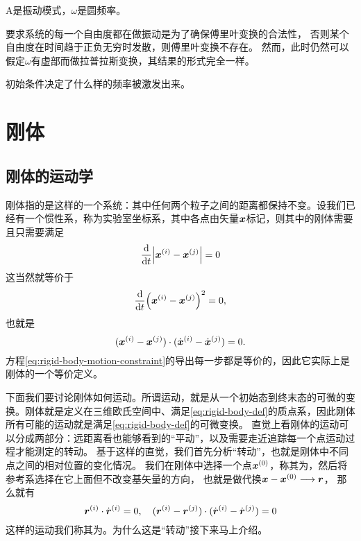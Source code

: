 A是振动模式，$\omega$是圆频率。

要求系统的每一个自由度都在做振动是为了确保傅里叶变换的合法性，
否则某个自由度在时间趋于正负无穷时发散，则傅里叶变换不存在。
然而，此时仍然可以假定$\omega$有虚部而做拉普拉斯变换，其结果的形式完全一样。

初始条件决定了什么样的频率被激发出来。

\chapter{刚体}

\section{刚体的运动学}

刚体指的是这样的一个系统：其中任何两个粒子之间的距离都保持不变。设我们已经有一个惯性系，称为实验室坐标系，其中各点由矢量$\vb*{x}$标记，则其中的刚体需要且只需要满足
\begin{equation}
    \dv{t} \abs{\vb*{x}^{(i)} - \vb*{x}^{(j)}} = 0
    \label{eq:rigid-body-def}
\end{equation}
这当然就等价于
\[
    \dv{t} (\vb*{x}^{(i)} - \vb*{x}^{(j)})^2 = 0,
\]
也就是
\begin{equation}
    (\vb*{x}^{(i)} - \vb*{x}^{(j)}) \cdot (\dot{\vb*{x}}^{(i)} - \dot{\vb*{x}}^{(j)}) = 0.
    \label{eq:rigid-body-motion-constraint}
\end{equation}
方程\eqref{eq:rigid-body-motion-constraint}的导出每一步都是等价的，因此它实际上是刚体的一个等价定义。

下面我们要讨论刚体如何运动。所谓运动，就是从一个初始态到终末态的可微的变换。刚体就是定义在三维欧氏空间中、满足\eqref{eq:rigid-body-def}的质点系，因此刚体所有可能的运动就是满足\eqref{eq:rigid-body-def}的可微变换。
直觉上看刚体的运动可以分成两部分：远距离看也能够看到的“平动”，以及需要走近追踪每一个点运动过程才能测定的转动。
基于这样的直觉，我们首先分析“转动”，也就是刚体中不同点之间的相对位置的变化情况。
我们在刚体中选择一个点$\vb*{x}^{(0)}$，称其为，然后将参考系选择在它上面但不改变基矢量的方向，
也就是做代换$\vb*{x} - \vb*{x}^{(0)} \longrightarrow \vb*{r}$，
那么就有
\begin{equation}
    \vb*{r}^{(i)} \cdot {\dot{\vb*{r}}}^{(i)} = 0, \quad (\vb*{r}^{(i)} - \vb*{r}^{(j)}) \cdot (\dot{\vb*{r}}^{(i)} - \dot{\vb*{r}}^{(j)}) = 0
    \label{eq:around-a-point}
\end{equation}
这样的运动我们称其为。为什么这是“转动”接下来马上介绍。

